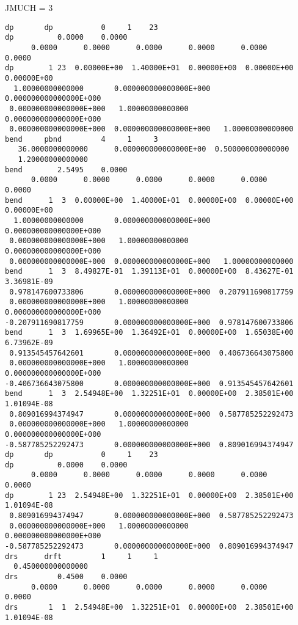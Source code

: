 JMUCH = 3

\begin{footnotesize}
\begin{verbatim}
dp       dp           0     1    23
dp          0.0000    0.0000
      0.0000      0.0000      0.0000      0.0000      0.0000      0.0000
dp        1 23  0.00000E+00  1.40000E+01  0.00000E+00  0.00000E+00  0.00000E+00
  1.00000000000000       0.000000000000000E+000  0.000000000000000E+000
 0.000000000000000E+000   1.00000000000000       0.000000000000000E+000
 0.000000000000000E+000  0.000000000000000E+000   1.00000000000000
bend     pbnd         4     1     3
   36.0000000000000      0.000000000000000E+00  0.500000000000000
   1.20000000000000
bend        2.5495    0.0000
      0.0000      0.0000      0.0000      0.0000      0.0000      0.0000
bend      1  3  0.00000E+00  1.40000E+01  0.00000E+00  0.00000E+00  0.00000E+00
  1.00000000000000       0.000000000000000E+000  0.000000000000000E+000
 0.000000000000000E+000   1.00000000000000       0.000000000000000E+000
 0.000000000000000E+000  0.000000000000000E+000   1.00000000000000
bend      1  3  8.49827E-01  1.39113E+01  0.00000E+00  8.43627E-01  3.36981E-09
 0.978147600733806       0.000000000000000E+000  0.207911690817759
 0.000000000000000E+000   1.00000000000000       0.000000000000000E+000
-0.207911690817759       0.000000000000000E+000  0.978147600733806
bend      1  3  1.69965E+00  1.36492E+01  0.00000E+00  1.65038E+00  6.73962E-09
 0.913545457642601       0.000000000000000E+000  0.406736643075800
 0.000000000000000E+000   1.00000000000000       0.000000000000000E+000
-0.406736643075800       0.000000000000000E+000  0.913545457642601
bend      1  3  2.54948E+00  1.32251E+01  0.00000E+00  2.38501E+00  1.01094E-08
 0.809016994374947       0.000000000000000E+000  0.587785252292473
 0.000000000000000E+000   1.00000000000000       0.000000000000000E+000
-0.587785252292473       0.000000000000000E+000  0.809016994374947
dp       dp           0     1    23
dp          0.0000    0.0000
      0.0000      0.0000      0.0000      0.0000      0.0000      0.0000
dp        1 23  2.54948E+00  1.32251E+01  0.00000E+00  2.38501E+00  1.01094E-08
 0.809016994374947       0.000000000000000E+000  0.587785252292473
 0.000000000000000E+000   1.00000000000000       0.000000000000000E+000
-0.587785252292473       0.000000000000000E+000  0.809016994374947
drs      drft         1     1     1
  0.450000000000000
drs         0.4500    0.0000
      0.0000      0.0000      0.0000      0.0000      0.0000      0.0000
drs       1  1  2.54948E+00  1.32251E+01  0.00000E+00  2.38501E+00  1.01094E-08

\end{verbatim}
\end{footnotesize}
